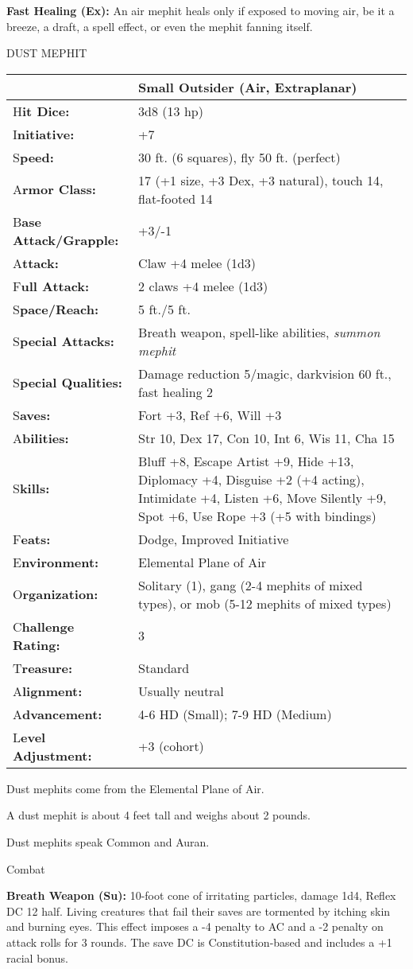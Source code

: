 \documentclass{article}
\begin{document}
\textbf{Fast Healing (Ex):} An air mephit heals only if exposed to moving air, 
be it a breeze, a draft, a spell effect, or even the mephit fanning itself.

\vspace{12pt}
DUST MEPHIT

\begin{tabular}{|>{\raggedright}p{87pt}|>{\raggedright}p{238pt}|}
\hline
  & Small Outsider (Air, Extraplanar)\tabularnewline
\hline
H\textbf{it Dice:} & 3d8 (13 hp)\tabularnewline
\hline
I\textbf{nitiative:} & +7\tabularnewline
\hline
S\textbf{peed:} & 30 ft. (6 squares), fly 50 ft. (perfect)\tabularnewline
\hline
A\textbf{rmor Class:} & 17 (+1 size, +3 Dex, +3 natural), touch 14, flat-footed 
14\tabularnewline
\hline
B\textbf{ase Attack/Grapple:} & +3/-1\tabularnewline
\hline
A\textbf{ttack:} & Claw +4 melee (1d3)\tabularnewline
\hline
F\textbf{ull Attack:} & 2 claws +4 melee (1d3)\tabularnewline
\hline
S\textbf{pace/Reach:} & 5 ft./5 ft.\tabularnewline
\hline
S\textbf{pecial Attacks:} & Breath weapon, spell-like abilities, \textit{summon 
mephit}\tabularnewline
\hline
S\textbf{pecial Qualities:} & Damage reduction 5/magic, darkvision 60 ft., fast 
healing 2\tabularnewline
\hline
S\textbf{aves:} & Fort +3, Ref +6, Will +3\tabularnewline
\hline
A\textbf{bilities:} & Str 10, Dex 17, Con 10, Int 6, Wis 11, Cha 15\tabularnewline
\hline
S\textbf{kills:} & Bluff +8, Escape Artist +9, Hide +13, Diplomacy +4, Disguise 
+2 (+4 acting), Intimidate +4, Listen +6, Move Silently +9, Spot +6, Use Rope +3 
(+5 with bindings)\tabularnewline
\hline
F\textbf{eats:} & Dodge, Improved Initiative\tabularnewline
\hline
E\textbf{nvironment:} & Elemental Plane of Air\tabularnewline
\hline
O\textbf{rganization:} & Solitary (1), gang (2-4 mephits of mixed types), or mob 
(5-12 mephits of mixed types)\tabularnewline
\hline
C\textbf{hallenge Rating:} & 3\tabularnewline
\hline
T\textbf{reasure:} & Standard\tabularnewline
\hline
A\textbf{lignment:} & Usually neutral\tabularnewline
\hline
A\textbf{dvancement:} & 4-6 HD (Small); 7-9 HD (Medium)\tabularnewline
\hline
L\textbf{evel Adjustment:} & +3 (cohort)\tabularnewline
\hline
\end{tabular}

Dust mephits come from the Elemental Plane of Air.

A dust mephit is about 4 feet tall and weighs about 2 pounds.

Dust mephits speak Common and Auran.

Combat

\textbf{Breath Weapon (Su):} 10-foot cone of irritating particles, damage 1d4, 
Reflex DC 12 half. Living creatures that fail their saves are tormented by itching 
skin and burning eyes. This effect imposes a -4 penalty to AC and a -2 penalty 
on attack rolls for 3 rounds. The save DC is Constitution-based and includes a 
+1 racial bonus.
\end{document}
